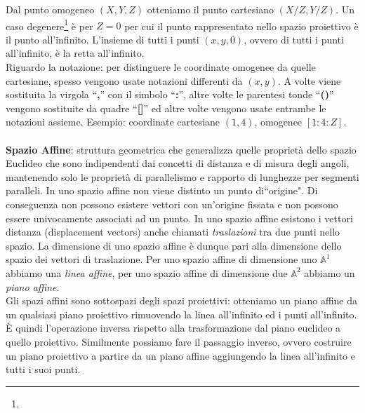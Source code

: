 \documentclass[a4paper,12pt]{tesiinfo}
\renewcommand{\footnotesize}{\fontsize{9pt}{11pt}\selectfont}
\begin{document}
Dal punto omogeneo $(X, Y, Z)$ otteniamo il punto cartesiano $(X/Z, Y/Z)$. Un caso degenere\footnote{\footnotesize{Enti/operazioni che pur rientrando sotto una data definizione (o in una data classe) presentano delle particolarit\`a che li differenziano dall'elemento generico  della classe stessa, ad esempio: conica degenere, costituita da due rette; quadrica degenere, dotata di punti doppi (cono, cilindro, ecc.)}} \`e per $Z=0$ per cui il punto rappresentato nello spazio proiettivo \`e il punto all'infinito. L'insieme di tutti i punti $(x, y, 0)$, ovvero di tutti i punti all'infinito, \`e la retta all'infinito.
\\
Riguardo la notazione: per distinguere le coordinate omogenee da quelle cartesiane, spesso vengono usate notazioni differenti da $(x, y)$. A volte viene sostituita la virgola ``\textbf{,}'' con il simbolo ``\textbf{:}'', altre volte le parentesi tonde ``\textbf{()}'' vengono sostituite da quadre ``\textbf{[]}'' ed altre volte vengono usate entrambe le notazioni assieme. Esempio: coordinate cartesiane $(1, 4)$, omogenee $[1:4:Z]$.
\\\\
%
%
%
\textbf{Spazio Affine}: struttura geometrica che generalizza quelle propriet\`a dello spazio Euclideo che sono indipendenti dai concetti di distanza e di misura degli angoli, mantenendo solo le propriet\`a di parallelismo e rapporto di lunghezze per segmenti paralleli. In uno spazio affine non viene distinto un punto di``origine". Di conseguenza non possono esistere vettori con un'origine fissata e non possono essere univocamente associati ad un punto. In uno spazio affine esistono i vettori distanza (displacement vectors) anche chiamati \textit{traslazioni} tra due punti nello spazio. La dimensione di uno spazio affine \`e dunque pari alla dimensione dello spazio dei vettori di traslazione. Per uno spazio affine di dimensione uno $\mathbb{A}^1$ abbiamo una \textit{linea affine}, per uno spazio affine di dimensione due $\mathbb{A}^2$ abbiamo un \textit{piano affine}.
\\
Gli spazi affini sono sottospazi degli spazi proiettivi: otteniamo un piano affine da un qualsiasi piano proiettivo rimuovendo la linea all'infinito ed i punti all'infinito. \`E quindi l'operazione inversa rispetto alla trasformazione dal piano euclideo a quello proiettivo. Similmente possiamo fare il passaggio inverso, ovvero costruire un piano proiettivo a partire da un piano affine aggiungendo la linea all'infinito e tutti i suoi punti.
\end{document}
